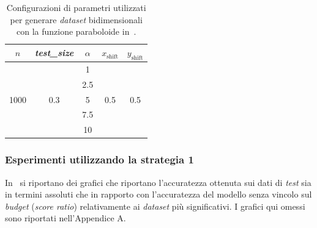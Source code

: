 \begin{table}
    \centering
    \begin{tabular}{ccccc}
        \toprule
         $n$ & \emph{test\_size} &$\alpha$ & $x_\text{shift}$ & $y_\text{shift}$ \\
        \midrule
        \multirow{5}{*}{1000} & \multirow{5}{*}{0.3} &1   & \multirow{5}{*}{0.5} & \multirow{5}{*}{0.5} \\
        && 2.5 &\\
        && 5   &\\
        && 7.5 &\\
        && 10  &\\
        \bottomrule
    \end{tabular}
    \caption{Configurazioni di parametri utilizzati per generare \emph{dataset} bidimensionali con la funzione paraboloide in~.}
    \label{tab:parametri_ds_pacman}
\end{table}

\subsubsection{Esperimenti utilizzando la strategia 1}
In~ si riportano dei grafici che riportano l'accuratezza ottenuta sui dati di \emph{test} sia in termini assoluti che in rapporto con l'accuratezza del modello senza vincolo sul \emph{budget} (\emph{score ratio}) relativamente ai \emph{dataset} più significativi.
I grafici qui omessi sono riportati nell'Appendice A.

